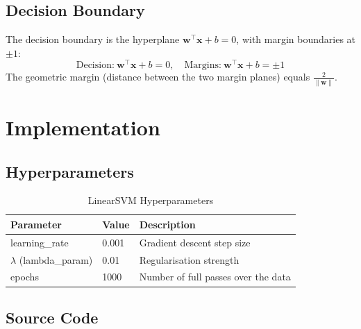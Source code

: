 \documentclass[12pt,a4paper]{article}
\begin{document}
\subsection{Decision Boundary}

The decision boundary is the hyperplane $\mathbf{w}^\top\mathbf{x} + b = 0$, with margin boundaries at $\pm 1$:
\[
\text{Decision:}\ \mathbf{w}^\top\mathbf{x} + b = 0, \quad
\text{Margins:}\ \mathbf{w}^\top\mathbf{x} + b = \pm 1
\]
The geometric margin (distance between the two margin planes) equals $\frac{2}{\|\mathbf{w}\|}$.

\section{Implementation}

\subsection{Hyperparameters}
\begin{table}[H]
\centering
\caption{LinearSVM Hyperparameters}
\begin{tabular}{lll}
\toprule
\textbf{Parameter} & \textbf{Value} & \textbf{Description} \\ \midrule
learning\_rate & 0.001 & Gradient descent step size \\
$\lambda$ (lambda\_param) & 0.01  & Regularisation strength \\
epochs         & 1000  & Number of full passes over the data \\
\bottomrule
\end{tabular}
\end{table}

\subsection{Source Code}
\end{document}
